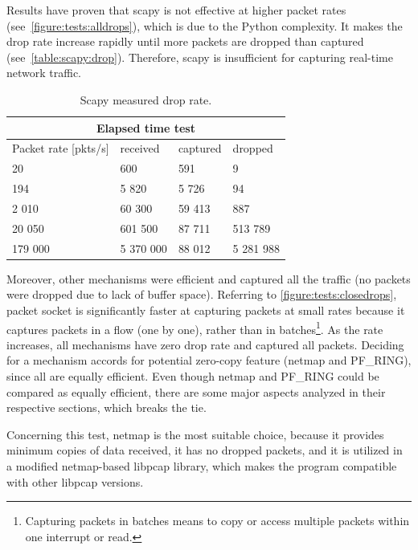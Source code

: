 \documentclass[12pt,a4paper,twoside]{book}
\begin{document}
                
                Results have proven that scapy is not effective at higher packet rates (see~\autoref{figure:tests:alldrops}), which is due to the Python complexity. It makes the drop rate increase rapidly until more packets are dropped than captured (see~\autoref{table:scapy:drop}). Therefore, scapy is insufficient for capturing real-time network traffic.
                \begin{table}[h]
                    \centering
                \begin{tabular}{ |p{3cm}||p{3cm}|p{3cm}|p{3cm}| }
                     \hline
                     \multicolumn{4}{|c|}{Elapsed time test} \\
                     \hline
                     Packet rate [pkts/s] & received & captured & dropped \\
                     \hline
                     20    & 600 & 591 & 9 \\
                     194    & 5 820 & 5 726 & 94 \\
                     2 010    & 60 300 & 59 413 & 887 \\
                     20 050    & 601 500 & 87 711 & 513 789 \\
                     179 000    & 5 370 000 & 88 012 & 5 281 988 \\
                     \hline
                \end{tabular}
                    \caption{Scapy measured drop rate.}
                    \label{table:scapy:drop}
                \end{table}
                \par
                Moreover, other mechanisms were efficient and captured all the traffic (no packets were dropped due to lack of buffer space). Referring to \autoref{figure:tests:closedrops}, packet socket is significantly faster at capturing packets at small rates because it captures packets in a flow (one by one), rather than in batches\footnote{Capturing packets in batches means to copy or access multiple packets within one interrupt or read.}. As the rate increases, all mechanisms have zero drop rate and captured all packets. Deciding for a mechanism accords for potential zero-copy feature (netmap and PF\_RING), since all are equally efficient. Even though netmap and PF\_RING could be compared as equally efficient, there are some major aspects analyzed in their respective sections, which breaks the tie.\par
                Concerning this test, netmap is the most suitable choice, because it provides minimum copies of data received, it has no dropped packets, and it is utilized in a modified netmap-based libpcap library, which makes the program compatible with other libpcap versions.
\end{document}
